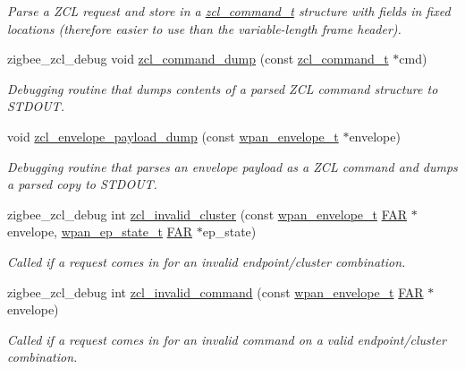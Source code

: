 \begin{DoxyCompactItemize}
\begin{DoxyCompactList}\small\item\em Parse a Z\+CL request and store in a \hyperlink{structzcl__command__t}{zcl\+\_\+command\+\_\+t} structure with fields in fixed locations (therefore easier to use than the variable-\/length frame header). \end{DoxyCompactList}\item 
zigbee\+\_\+zcl\+\_\+debug void \hyperlink{group__zcl_gaca5c04dd787b041bf40f3b2a4463bb70}{zcl\+\_\+command\+\_\+dump} (const \hyperlink{structzcl__command__t}{zcl\+\_\+command\+\_\+t} $\ast$cmd)
\begin{DoxyCompactList}\small\item\em Debugging routine that dumps contents of a parsed Z\+CL command structure to S\+T\+D\+O\+UT. \end{DoxyCompactList}\item 
void \hyperlink{group__zcl_ga2057f6176d44e9fad2df4f619e5777d3}{zcl\+\_\+envelope\+\_\+payload\+\_\+dump} (const \hyperlink{structwpan__envelope__t}{wpan\+\_\+envelope\+\_\+t} $\ast$envelope)
\begin{DoxyCompactList}\small\item\em Debugging routine that parses an envelope payload as a Z\+CL command and dumps a parsed copy to S\+T\+D\+O\+UT. \end{DoxyCompactList}\item 
zigbee\+\_\+zcl\+\_\+debug int \hyperlink{group__zcl_ga23e4657d006b8b39ac54f0ee61786910}{zcl\+\_\+invalid\+\_\+cluster} (const \hyperlink{structwpan__envelope__t}{wpan\+\_\+envelope\+\_\+t} \hyperlink{group__hal_gaef060b3456fdcc093a7210a762d5f2ed}{F\+AR} $\ast$envelope, \hyperlink{structwpan__ep__state__t}{wpan\+\_\+ep\+\_\+state\+\_\+t} \hyperlink{group__hal_gaef060b3456fdcc093a7210a762d5f2ed}{F\+AR} $\ast$ep\+\_\+state)
\begin{DoxyCompactList}\small\item\em Called if a request comes in for an invalid endpoint/cluster combination. \end{DoxyCompactList}\item 
zigbee\+\_\+zcl\+\_\+debug int \hyperlink{group__zcl_ga4251fbed33d85d2f7bbccb48857cae95}{zcl\+\_\+invalid\+\_\+command} (const \hyperlink{structwpan__envelope__t}{wpan\+\_\+envelope\+\_\+t} \hyperlink{group__hal_gaef060b3456fdcc093a7210a762d5f2ed}{F\+AR} $\ast$envelope)
\begin{DoxyCompactList}\small\item\em Called if a request comes in for an invalid command on a valid endpoint/cluster combination. \end{DoxyCompactList}\item 

\end{DoxyCompactItemize}
